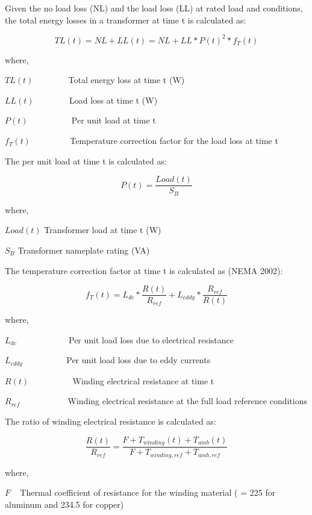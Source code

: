 Given the no load loss (NL) and the load loss (LL) at rated load and conditions, the total energy losses in a transformer at time t is calculated as:

\begin{equation}
TL(t) = NL + LL(t) = NL + LL*P{(t)^2}*{f_T}(t)
\end{equation}

where,

\(TL(t)\) ~~~~~~~ Total energy loss at time t (W)

\(LL(t)\) ~~~~~~~ Load loss at time t (W)

\(P(t)\) ~~~~~~~~~ Per unit load at time t

\({f_T}(t)\) ~~~~~~~~ Temperature correction factor for the load loss at time t

The per unit load at time t is calculated as:

\begin{equation}
P(t) = \frac{{Load(t)}}{{{S_B}}}
\end{equation}

where,

\(Load(t)\) Transformer load at time t (W)

\({S_B}\) Transformer nameplate rating (VA)

The temperature correction factor at time t is calculated as (NEMA 2002):

\begin{equation}
{f_T}(t) = {L_{dc}}*\frac{{R(t)}}{{{R_{ref}}}} + {L_{eddy}}*\frac{{{R_{ref}}}}{{R(t)}}
\end{equation}

where,

\({L_{dc}}\) ~~~~~~~~~~~ Per unit load loss due to electrical resistance

\({L_{eddy}}\) ~~~~~~~~~ Per unit load loss due to eddy currents

\(R(t)\) ~~~~~~~~~ Winding electrical resistance at time t

\({R_{ref}}\) ~~~~~~~~~~ Winding electrical resistance at the full load reference conditions

The ratio of winding electrical resistance is calculated as:

\begin{equation}
\frac{{R(t)}}{{{R_{ref}}}} = \frac{{F + {T_{winding}}(t) + {T_{amb}}(t)}}{{F + {T_{winding,ref}} + {T_{amb,ref}}}}
\end{equation}

where,

\(F\) ~ Thermal coefficient of resistance for the winding material ( = 225 for aluminum and 234.5 for copper)

